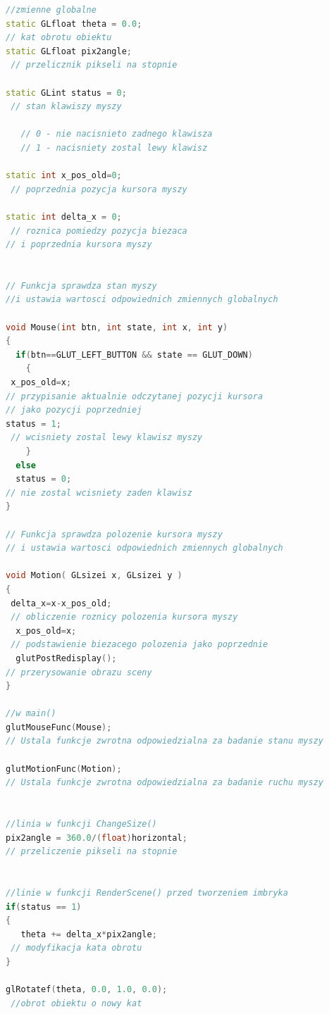 \documentclass[a4paper,11pt]{article}
\begin{document}
{\small
\begin{lstlisting}[language=C++]
//zmienne globalne
static GLfloat theta = 0.0;   
// kat obrotu obiektu
static GLfloat pix2angle;    
 // przelicznik pikseli na stopnie

static GLint status = 0;      
 // stan klawiszy myszy 
                            
   // 0 - nie nacisnieto zadnego klawisza
   // 1 - nacisniety zostal lewy klawisz

static int x_pos_old=0;      
 // poprzednia pozycja kursora myszy

static int delta_x = 0;       
 // roznica pomiedzy pozycja biezaca
// i poprzednia kursora myszy 


// Funkcja sprawdza stan myszy 
//i ustawia wartosci odpowiednich zmiennych globalnych

void Mouse(int btn, int state, int x, int y)
{
  if(btn==GLUT_LEFT_BUTTON && state == GLUT_DOWN)        
    {
 x_pos_old=x;         
// przypisanie aktualnie odczytanej pozycji kursora 
// jako pozycji poprzedniej
status = 1;         
 // wcisniety zostal lewy klawisz myszy
    } 
  else
  status = 0;          
// nie zostal wcisniety zaden klawisz 
}

// Funkcja sprawdza polozenie kursora myszy
// i ustawia wartosci odpowiednich zmiennych globalnych

void Motion( GLsizei x, GLsizei y )
{
 delta_x=x-x_pos_old;    
 // obliczenie roznicy polozenia kursora myszy
  x_pos_old=x;           
 // podstawienie biezacego polozenia jako poprzednie
  glutPostRedisplay();     
// przerysowanie obrazu sceny
}

//w main()
glutMouseFunc(Mouse);
// Ustala funkcje zwrotna odpowiedzialna za badanie stanu myszy
    
glutMotionFunc(Motion);
// Ustala funkcje zwrotna odpowiedzialna za badanie ruchu myszy


//linia w funkcji ChangeSize()
pix2angle = 360.0/(float)horizontal;  
// przeliczenie pikseli na stopnie


//linie w funkcji RenderScene() przed tworzeniem imbryka
if(status == 1)             
{
   theta += delta_x*pix2angle;   
 // modyfikacja kata obrotu
}                                 

glRotatef(theta, 0.0, 1.0, 0.0); 
 //obrot obiektu o nowy kat
\end{lstlisting}
}
\end{document}
